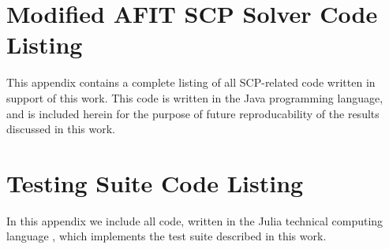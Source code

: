 \documentclass[12pt]{article}
\begin{document}
	\pagebreak
	\appendix		%
	
	\section{Modified AFIT SCP Solver Code Listing}
	
	This appendix contains a complete listing of all SCP-related code written in support of this work. This code is written in the Java programming language, and is included herein for the purpose of future reproducability of the results discussed in this work.
	
	
	
	
	
	
	
	\section{Testing Suite Code Listing}
	In this appendix we include all code, written in the Julia technical computing language \cite{Julia}, which implements the test suite described in this work. 
	
	
	
	
	
\end{document}
